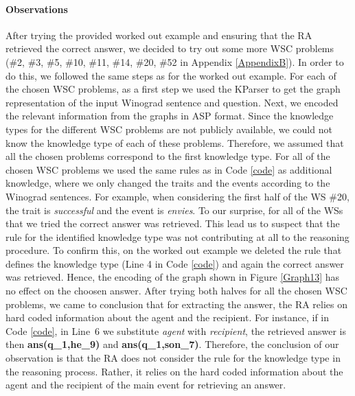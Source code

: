 \paragraph{Observations}
After trying the provided worked out example and ensuring that the RA retrieved the correct answer, we decided to try out some more WSC problems (\#2, \#3, \#5, \#10, \#11, \#14, \#20, \#52 in Appendix \ref{AppendixB}).
In order to do this, we followed the same steps as for the worked out example. For each of the chosen WSC problems, as a first step we used the KParser to get the graph representation of the input Winograd sentence and question. Next, we encoded the relevant information from the graphs in ASP format. Since the knowledge types for the different WSC problems are not publicly available, we could not know the knowledge type of each of these problems. Therefore, we assumed that all the chosen problems correspond to the first knowledge type. For all of the chosen WSC problems we used the same rules as in Code \ref{code} as additional knowledge, where we only changed the traits and the events according to the Winograd sentences. For example, when considering the first half of the WS \#20, the trait is \textit{successful} and the event is \textit{envies}. To our surprise, for all of the WSs that we tried the correct answer was retrieved. This lead us to suspect that the rule for the identified knowledge type was not contributing at all to the reasoning procedure. 
To confirm this, on the worked out example we deleted the rule that defines the knowledge type (Line 4 in Code \ref{code}) and again the correct answer was retrieved. Hence, the encoding of the graph shown in Figure \ref{Graph13} has no effect on the choosen answer. After trying both halves for all the chosen WSC problems, we came to conclusion that for extracting the answer, the RA relies on hard coded information about the agent and the recipient. For instance, if in Code \ref{code}, in Line~6 we substitute \textit{agent} with \textit{recipient}, the retrieved answer is then \textbf{ans(q\_1,he\_9)} and \textbf{ans(q\_1,son\_7)}.
Therefore, the conclusion of our observation is that the RA does not consider the rule for the knowledge type in the reasoning process. Rather, it relies on the hard coded information about the agent and the recipient of the main event for retrieving an answer. 

